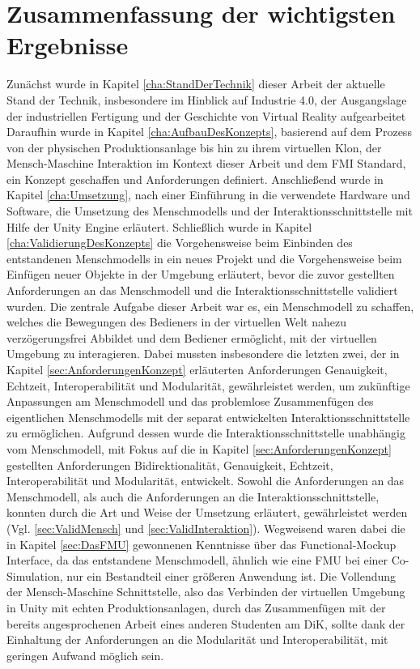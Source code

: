 \section{Zusammenfassung der wichtigsten Ergebnisse}\label{sec:ZusammenfassungErgebnisse}
Zunächst wurde in Kapitel \ref{cha:StandDerTechnik} dieser Arbeit der aktuelle Stand der Technik, insbesondere im Hinblick auf Industrie 4.0, der Ausgangslage der industriellen Fertigung und der Geschichte von Virtual Reality aufgearbeitet
Daraufhin wurde in Kapitel \ref{cha:AufbauDesKonzepts}, basierend auf dem Prozess von der physischen Produktionsanlage bis hin zu ihrem virtuellen Klon, der Mensch-Maschine Interaktion im Kontext dieser Arbeit und dem FMI Standard, ein Konzept geschaffen und Anforderungen definiert.
Anschließend wurde in Kapitel \ref{cha:Umsetzung}, nach einer Einführung in die verwendete Hardware und Software, die Umsetzung des Menschmodells und der Interaktionsschnittstelle mit Hilfe der Unity Engine erläutert. 
Schließlich wurde in Kapitel \ref{cha:ValidierungDesKonzepts} die Vorgehensweise beim Einbinden des entstandenen Menschmodells in ein neues Projekt und die Vorgehensweise beim Einfügen neuer Objekte in der Umgebung erläutert, bevor die zuvor gestellten Anforderungen an das Menschmodell und die Interaktionsschnittstelle validiert wurden.
\newline\newline
Die zentrale Aufgabe dieser Arbeit war es, ein Menschmodell zu schaffen, welches die Bewegungen des Bedieners in der virtuellen Welt nahezu verzögerungsfrei Abbildet und dem Bediener ermöglicht, mit der virtuellen Umgebung zu interagieren. Dabei mussten insbesondere die letzten zwei, der in Kapitel \ref{sec:AnforderungenKonzept} erläuterten Anforderungen Genauigkeit, Echtzeit, Interoperabilität und Modularität, gewährleistet werden, um zukünftige Anpassungen am Menschmodell und das problemlose Zusammenfügen des eigentlichen Menschmodells mit der separat entwickelten Interaktionsschnittstelle zu ermöglichen.
Aufgrund dessen wurde die Interaktionsschnittstelle unabhängig vom Menschmodell, mit Fokus auf die in Kapitel \ref{sec:AnforderungenKonzept} gestellten Anforderungen Bidirektionalität, Genauigkeit, Echtzeit, Interoperabilität und Modularität, entwickelt. Sowohl die Anforderungen an das Menschmodell, als auch die Anforderungen an die Interaktionsschnittstelle, konnten durch die Art und Weise der Umsetzung erläutert, gewährleistet werden (Vgl. \ref{sec:ValidMensch} und \ref{sec:ValidInteraktion}).
Wegweisend waren dabei die in Kapitel \ref{sec:DasFMU} gewonnenen Kenntnisse über das Functional-Mockup Interface, da das entstandene Menschmodell, ähnlich wie eine FMU bei einer Co-Simulation, nur ein Bestandteil einer größeren Anwendung ist. Die Vollendung der Mensch-Maschine Schnittstelle, also das Verbinden der virtuellen Umgebung in Unity mit echten Produktionsanlagen, durch das Zusammenfügen mit der bereits angesprochenen Arbeit eines anderen Studenten am DiK, sollte dank der Einhaltung der Anforderungen an die Modularität und Interoperabilität, mit geringen Aufwand möglich sein.
